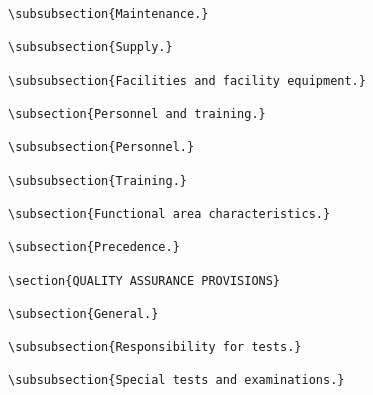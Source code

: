 \begin{itemize}
\begin{small}
\begin{verbatim}
\subsubsection{Maintenance.}

\subsubsection{Supply.}

\subsubsection{Facilities and facility equipment.}

\subsection{Personnel and training.}

\subsubsection{Personnel.}

\subsubsection{Training.}

\subsection{Functional area characteristics.}

\subsection{Precedence.}

\section{QUALITY ASSURANCE PROVISIONS}

\subsection{General.}

\subsubsection{Responsibility for tests.}

\subsubsection{Special tests and examinations.}


\end{verbatim}
\end{small}
\end{itemize}
